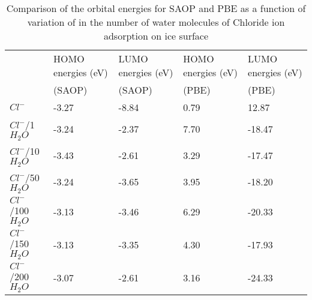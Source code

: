 \documentclass[a4paper,11pt]{report}
\begin{document}
\begin{table}[H]\small
\begin{center}
\caption{Comparison of the orbital energies for SAOP and PBE as a function of variation of in the number of water molecules of Chloride ion adsorption on ice surface} \label{tab:1}
\begin{tabular}{|l|l|l|l|l|}
\hline
&HOMO energies (eV)&LUMO energies (eV)&HOMO energies (eV)&LUMO energies (eV) \\
&\hspace*{1.0cm}(SAOP)&\hspace*{1.0cm}(SAOP)&\hspace*{1.0cm}(PBE)&\hspace*{1.0cm}(PBE)\\ 
\hline
$Cl^{-}$&\hspace*{1.0cm}-3.27&\hspace*{1.0cm}-8.84&\hspace*{1.0cm}0.79&\hspace*{1.0cm}12.87\\
\hline
$Cl^{-}$/1 $H_{2}O$&\hspace*{1.0cm}-3.24&\hspace*{1.0cm}-2.37&\hspace*{1.0cm}7.70&\hspace*{1.0cm}-18.47\\
\hline
$Cl^{-}$/10 $H_{2}O$&\hspace*{1.0cm}-3.43&\hspace*{1.0cm}-2.61&\hspace*{1.0cm}3.29&\hspace*{1.0cm}-17.47\\
\hline
$Cl^{-}$/50 $H_{2}O$&\hspace*{1.0cm}-3.24&\hspace*{1.0cm}-3.65&\hspace*{1.0cm}3.95&\hspace*{1.0cm}-18.20\\
\hline
$Cl^{-}$/100 $H_{2}O$&\hspace*{1.0cm}-3.13&\hspace*{1.0cm}-3.46&\hspace*{1.0cm}6.29&\hspace*{1.0cm}-20.33\\
\hline
$Cl^{-}$/150 $H_{2}O$&\hspace*{1.0cm}-3.13&\hspace*{1.0cm}-3.35&\hspace*{1.0cm}4.30&\hspace*{1.0cm}-17.93\\
\hline
$Cl^{-}$/200 $H_{2}O$&\hspace*{1.0cm}-3.07&\hspace*{1.0cm}-2.61&\hspace*{1.0cm}3.16&\hspace*{1.0cm}-24.33\\
\hline
\end{tabular}
\label{table1}
\end{center}
\end{table}
\end{document}

